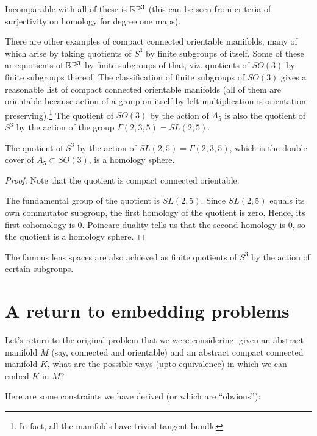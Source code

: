 \documentclass[a4paper]{amsart}
\begin{document}
Incomparable with all of these is $\mathbb{R}\mathbb{P}^3$ (this can be seen
from criteria of surjectivity on homology for degree one maps).

There are other examples of compact connected orientable manifolds,
many of which arise by taking quotients of $S^3$ by finite subgroups
of itself. Some of these ar equotients of
$\mathbb{R}\mathbb{P}^3$ by finite subgroups of that, viz. quotients of
$SO(3)$ by finite subgroups thereof. The classification of finite
subgroups of $SO(3)$ gives a reasonable list of compact connected
orientable manifolds (all of them are orientable because action of a
group on itself by left multiplication is orientation-preserving).\footnote{In fact, all the manifolds have trivial tangent bundle} The
quotient of $SO(3)$ by the action of $A_5$ is also the quotient of
$S^3$ by the action of the group $\Gamma(2,3,5) = SL(2,5)$.

\begin{theorem}
  The quotient of $S^3$ by the action of $SL(2,5) = \Gamma(2,3,5)$,
  which is the double cover of $A_5 \subset SO(3)$, is a homology sphere.
\end{theorem}

\begin{proof}
  Note that the quotient is compact connected orientable.

  The fundamental group of the quotient is $SL(2,5)$. Since $SL(2,5)$
  equals its own commutator subgroup, the first homology of the
  quotient is zero. Hence, its first cohomology is $0$. Poincare
  duality tells us that the second homology is $0$, so the quotient is
  a homology sphere.
\end{proof}

The famous lens spaces are also achieved as finite quotients of $S^3$
by the action of certain subgroups.
\section{A return to embedding problems}

Let's return to the original problem that we were considering: given
an abstract manifold $M$ (say, connected and orientable) and an
abstract compact connected manifold $K$, what are the possible ways
(upto equivalence) in which we can embed $K$ in $M$?

Here are some constraints we have derived (or which are ``obvious''):
\end{document}
